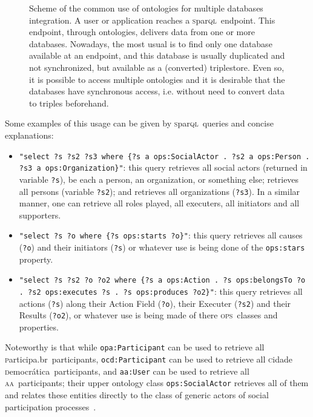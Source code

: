 \documentclass[10pt,letterpaper]{article}
\newcommand{\ops}{\textsc{ops}}
\newcommand{\sparql}{\textsc{s}par\textsc{ql}}
\newcommand{\aan}{\textsc{aa}}
\newcommand{\cidadedemocratica}{\textsc{c}idade \textsc{d}emocr\'atica}
\newcommand{\participa}{\textsc{p}articipa.br}
\begin{document}
\begin{figure}
    \centering
    \caption{Scheme of the common use of ontologies for multiple databases integration. A user or application reaches a \sparql\ endpoint. This endpoint, through ontologies, delivers data from one or more databases. Nowadays, the most usual is to find only one database available at an endpoint, and this database is usually duplicated and not synchronized, but available as a (converted) triplestore. Even so, it is possible to access multiple ontologies and it is desirable that the databases have synchronous access, i.e. without need to convert data to triples beforehand.}
    \label{endpoint}
\end{figure}

Some examples of this usage can be given by \sparql\ queries and concise explanations:
\begin{itemize}
    \item \texttt{"select ?s ?s2 ?s3 where \{?s a ops:SocialActor . ?s2 a ops:Person . ?s3 a ops:Organization\}"}: this query retrieves all social actors (returned in variable \texttt{?s}), be each a person, an organization, or something else; retrieves all persons (variable \texttt{?s2}); and retrieves all organizations (\texttt{?s3}). In a similar manner, one can retrieve all roles played, all executers, all initiators and all supporters.
    \item \texttt{"select ?s ?o where \{?s ops:starts ?o\}"}: this query retrieves all causes ({\tt ?o}) and their initiators ({\tt ?s}) or whatever use is being done of the {\tt ops:stars} property.
    \item \texttt{"select ?s ?s2 ?o ?o2 where \{?s a ops:Action . ?s ops:belongsTo ?o . ?s2 ops:executes ?s . ?s ops:produces ?o2\}"}: this query retrieves all actions (\texttt{?s}) along their Action Field (\texttt{?o}), their Executer (\texttt{?s2}) and their Results (\texttt{?o2}), or whatever use is being made of there \ops\ classes and properties.
\end{itemize}

Noteworthy is that while {\tt opa:Participant} can be used to retrieve all \participa\ participants, {\tt ocd:Participant} can be used to retrieve all \cidadedemocratica\ participants, and {\tt aa:User} can be used to retrieve all \aan\ participants; their upper ontology class {\tt ops:SocialActor} retrieves all of them and relates these entities directly to the class of generic actors of social participation processes~\cite{pnud5}.
\end{document}
